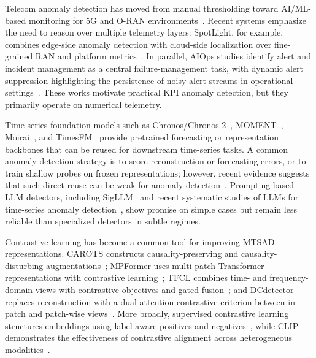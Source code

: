 \documentclass[conference]{IEEEtran}
\begin{document}
Telecom anomaly detection has moved from manual thresholding toward AI/ML-based monitoring for 5G and O-RAN environments~\cite{edozie2025telecomsurvey,azkaei2025oranmetrics,kumar2025falcon}. Recent systems emphasize the need to reason over multiple telemetry layers: SpotLight, for example, combines edge-side anomaly detection with cloud-side localization over fine-grained RAN and platform metrics~\cite{sun2024spotlight}. In parallel, AIOps studies identify alert and incident management as a central failure-management task, with dynamic alert suppression highlighting the persistence of noisy alert streams in operational settings~\cite{yu2024alertsurvey,bhukar2024dynamic,zhang2024aiopsllm}. These works motivate practical KPI anomaly detection, but they primarily operate on numerical telemetry.

Time-series foundation models such as Chronos/Chronos-2~\cite{ansari2024chronos,ansari2025chronos2}, MOMENT~\cite{goswami2024moment}, Moirai~\cite{woo2024moirai}, and TimesFM~\cite{das2024timesfm} provide pretrained forecasting or representation backbones that can be reused for downstream time-series tasks. A common anomaly-detection strategy is to score reconstruction or forecasting errors, or to train shallow probes on frozen representations; however, recent evidence suggests that such direct reuse can be weak for anomaly detection~\cite{zhu2026oneliners}. Prompting-based LLM detectors, including SigLLM~\cite{alnegheimish2024sigllm} and recent systematic studies of LLMs for time-series anomaly detection~\cite{zhou2025llmts}, show promise on simple cases but remain less reliable than specialized detectors in subtle regimes.

Contrastive learning has become a common tool for improving MTSAD representations. CAROTS constructs causality-preserving and causality-disturbing augmentations~\cite{kim2025carots}; MPFormer uses multi-patch Transformer representations with contrastive learning~\cite{ma2024mpformer}; TFCL combines time- and frequency-domain views with contrastive objectives and gated fusion~\cite{zhang2025tfcl}; and DCdetector replaces reconstruction with a dual-attention contrastive criterion between in-patch and patch-wise views~\cite{yang2023dcdetector}. More broadly, supervised contrastive learning structures embeddings using label-aware positives and negatives~\cite{khosla2020supervised}, while CLIP demonstrates the effectiveness of contrastive alignment across heterogeneous modalities~\cite{radford2021clip}.
\end{document}
